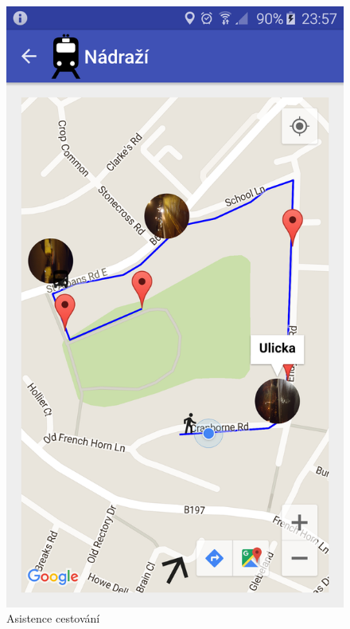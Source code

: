 \documentclass{article}
\begin{document}
\begin{figure}[H]
\begin{minipage}{.5\textwidth}
\centering
                \includegraphics[scale=0.14]{img/screen/asistencecestovani.png}
        \caption{Asistence cestování}
        \label{fig:asistence}
\end{minipage}
\begin{minipage}{.5\textwidth}
\centering

\end{minipage}
\end{figure}
\end{document}
